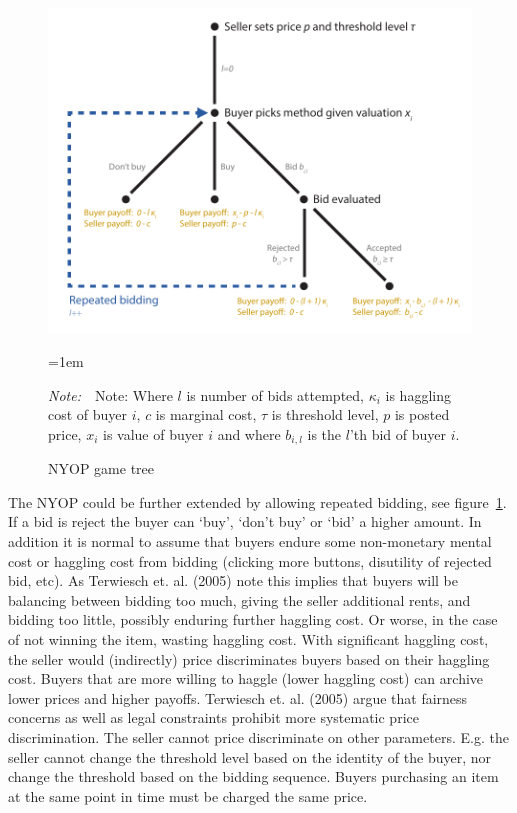 \documentclass[a4paper,12pt]{article}
\newcommand{\Figtext}[1]{%
	\begin{tablenotes}[para,flushleft]
		\hangindent=1em
		\footnotesize
		\raggedright
		#1
	\end{tablenotes}
}
\newcommand{\Fignote}[1]{\Figtext{\emph{Note:~}~#1}}
\begin{document}
	\begin{figure}
	        \centering
	        \caption{NYOP game tree}
	        \includegraphics[width=\textwidth]{Figures/NYOP_GameTree}
			\label{fig:game_tree}
			\Fignote{Note: Where $l$ is number of bids attempted, $\kappa_i$ is haggling cost of buyer $i$, $c$ is marginal cost, $\tau$ is threshold level, $p$ is posted price, $x_i$ is value of buyer $i$ and where $b_{i,l}$ is the $l$'th bid of buyer $i$.}
	\end{figure}

	The NYOP could be further extended by allowing repeated bidding, see figure~\ref{fig:game_tree}. If a bid is reject the buyer can `buy', `don't buy' or `bid' a higher amount. In addition it is normal to assume that buyers endure some non-monetary mental cost or haggling cost from bidding (clicking more buttons, disutility of rejected bid, etc). As Terwiesch et. al. (2005) note this implies that buyers will be balancing between bidding too much, giving the seller additional rents, and bidding too little, possibly enduring further haggling cost. Or worse, in the case of not winning the item, wasting haggling cost. With significant haggling cost, the seller would (indirectly) price discriminates buyers based on their haggling cost. Buyers that are more willing to haggle (lower haggling cost) can archive lower prices and higher payoffs. Terwiesch et. al. (2005) argue that fairness concerns as well as legal constraints prohibit more systematic price discrimination. The seller cannot price discriminate on other parameters. E.g. the seller cannot change the threshold level based on the identity of the buyer, nor change the threshold based on the bidding sequence. Buyers purchasing an item at the same point in time must be charged the same price.
\end{document}
